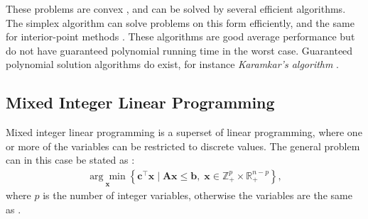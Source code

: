 These problems are convex \cite{wolsey2020integer}, and can be solved by several efficient algorithms. The simplex algorithm can solve problems on this form efficiently, and the same for interior-point methods \cite{nocedal2006numerical}. These algorithms are good average performance but do not have guaranteed polynomial running time in the worst case. Guaranteed polynomial solution algorithms do exist, for instance \textit{Karamkar's algorithm} \cite{karamkar1984new}. 


\subsection{Mixed Integer Linear Programming}

Mixed integer linear programming is a superset of linear programming, where one or more of the variables can be restricted to discrete values. The general problem can in this case be stated as \cite{gasse2019exact}:
\begin{align}\label{eq:milp}
    \underset{\mathbf{x}}{\arg \min }\left\{\mathbf{c}^{\top} \mathbf{x} \mid \mathbf{A} \mathbf{x} \leq \mathbf{b}, \; \mathbf{x} \in \mathbb{Z}_+^{p} \times \mathbb{R}_+^{n-p}\right\},
\end{align}
where $ p $ is the number of integer variables, otherwise the variables are the same as .

